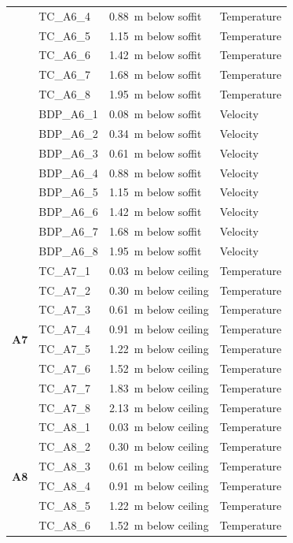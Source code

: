 \documentclass[12pt,oneside]{book}
\begin{document}
\begin{longtable}[c]{c|lll}
 & TC\_A6\_4  & 0.88~m below soffit  & Temperature \\
 & TC\_A6\_5  & 1.15~m below soffit  & Temperature \\
 & TC\_A6\_6  & 1.42~m below soffit  & Temperature \\
 & TC\_A6\_7  & 1.68~m below soffit  & Temperature \\
 & TC\_A6\_8  & 1.95~m below soffit  & Temperature \\
\cline{2-4}
 & BDP\_A6\_1 & 0.08~m below soffit  & Velocity \\
 & BDP\_A6\_2 & 0.34~m below soffit  & Velocity \\
 & BDP\_A6\_3 & 0.61~m below soffit  & Velocity \\
 & BDP\_A6\_4 & 0.88~m below soffit  & Velocity \\
 & BDP\_A6\_5 & 1.15~m below soffit  & Velocity \\
 & BDP\_A6\_6 & 1.42~m below soffit  & Velocity \\
 & BDP\_A6\_7 & 1.68~m below soffit  & Velocity \\
 & BDP\_A6\_8 & 1.95~m below soffit  & Velocity \\
\midrule
\multirow{8}{*}{\large{\textbf{A7}}}
 & TC\_A7\_1  & 0.03~m below ceiling & Temperature \\
 & TC\_A7\_2  & 0.30~m below ceiling & Temperature \\
 & TC\_A7\_3  & 0.61~m below ceiling & Temperature \\
 & TC\_A7\_4  & 0.91~m below ceiling & Temperature \\
 & TC\_A7\_5  & 1.22~m below ceiling & Temperature \\
 & TC\_A7\_6  & 1.52~m below ceiling & Temperature \\
 & TC\_A7\_7  & 1.83~m below ceiling & Temperature \\
 & TC\_A7\_8  & 2.13~m below ceiling & Temperature \\
\midrule
\multirow{8}{*}{\large{\textbf{A8}}}
 & TC\_A8\_1  & 0.03~m below ceiling & Temperature \\
 & TC\_A8\_2  & 0.30~m below ceiling & Temperature \\
 & TC\_A8\_3  & 0.61~m below ceiling & Temperature \\
 & TC\_A8\_4  & 0.91~m below ceiling & Temperature \\
 & TC\_A8\_5  & 1.22~m below ceiling & Temperature \\
 & TC\_A8\_6  & 1.52~m below ceiling & Temperature \\

\end{longtable}
\end{document}
